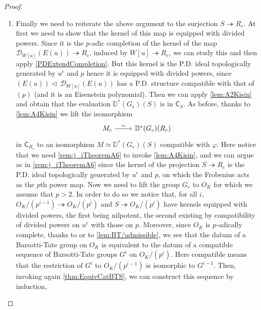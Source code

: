 \begin{proof}
\begin{enumerate}
\item Finally we need to reiterate the above argument to the surjection
	$S \twoheadrightarrow R_e$.
	At first we need to show that the kernel of this map is equipped with divided powers.
	Since it is the $p$-adic completion of the kernel
	of the map $\mathcal{D}_{W[u]}(E(u)) \twoheadrightarrow R_e$,
	induced by $W[u] \twoheadrightarrow R_e$, we can study this and
	then apply \cref{PDExtendCompletion}.
	But this kernel is the P.D. ideal topologically generated 
	by $u^e$ and $p$ hence it is equipped with divided powers,
	since $(E(u)) \triangleleft\, \mathcal{D}_{W[u]}(E(u))$ has a P.D. structure
	compatible with that of $(p)$ (and it is an Eisenstein polynomial).
	Then we can apply \cref{lem:A2Kisin} and obtain that the evaluation
	$\mathbb{D}^*(G_e)(S)$ is in $\mathsf{C}_{S}$.
	As before, thanks to \cref{lem:A4Kisin} we lift the isomorphism 
	\begin{equation*}
	\begin{tikzcd}
		M_e \arrow[r, "\sim", rightarrow] &
		\mathbb{D}^*(G_e)(R_e)
	\end{tikzcd}
	\end{equation*}
	in $\mathsf{C}_{R_e}$ to an isomorphism $M \simeq \mathbb{D}^*(G_e)(S)$
	compatible with $\varphi$.
	Here notice that we need \cref{rem:j_iTheoremA6} to invoke
	\cref{lem:A4Kisin}, and we can argue as in \cref{rem:j_iTheoremA6}
	since the kernel of the projection $S \twoheadrightarrow R_e$ is
	the P.D. ideal topologically generated by $u^e$ and $p$,
	on which the Frobenius acts as the $p$th power map.
	Now we need to lift the group $G_e$ to $O_K$ for which we assume that $p > 2$.
	In order to do so we notice that, for all $i$,
	$O_K/ (p^{i-1}) \twoheadrightarrow O_K/ (p^i)$ and
	$S \twoheadrightarrow O_K/ (p^i)$ have kernels equipped with
	divided powers, the first being nilpotent, the second existing by compatibility
	of divided powers on $u^e$ with those on $p$.
	Moreover, since $O_K$ is $p$-adically complete, thanks to \cite[Lemma 2.4.4]{deJong}
	or to \cref{lem:BT/admissible},
	we see that the datum of a Barsotti-Tate group on $O_K$ is equivalent to
	the datum of a compatible sequence of Barsotti-Tate groups $G^i$ on $O_K/ (p^i)$.
	Here compatible means that the restriction of $G^i$ to $O_K/ (p^{i-1})$
	is isomorphic to $G^{i-1}$.
	Then, invoking again \cref{thm:EquivCatBTS}, we can construct this sequence by induction,

\end{enumerate}
\end{proof}
